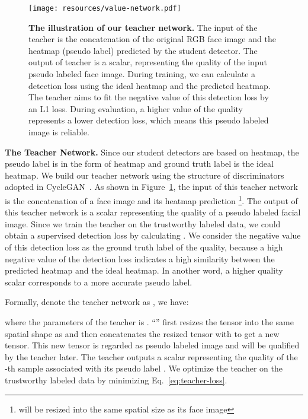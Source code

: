 \documentclass[10pt,twocolumn,letterpaper]{article}
\def\Figref#1{Figure~\ref{#1}}
\def\Eqref#1{{Eq.~\eqref{#1}}}
\begin{document}
\begin{figure}[t]
\center
\texttt{[image: resources/value-network.pdf]}
\caption{
\textbf{The illustration of our teacher network.}
The input of the teacher is the concatenation of the original RGB face image and the heatmap (pseudo label) predicted by the student detector.
The output of teacher is a scalar, representing the quality of the input pseudo labeled face image.
During training, we can calculate a detection loss using the ideal heatmap and the predicted heatmap.
The teacher aims to fit the negative value of this detection loss by an L1 loss.
During evaluation, a higher value of the quality represents a lower detection loss, which means this pseudo labeled image is reliable.
}
\label{fig:value-network}
\end{figure}



\textbf{The Teacher Network.}
Since our student detectors are based on heatmap, the pseudo label is in the form of heatmap and ground truth label is the ideal heatmap.
We build our teacher network using the structure of discriminators adopted in CycleGAN~\cite{zhu2017unpaired}.
As shown in \Figref{fig:value-network}, the input of this teacher network is the concatenation of a face image and its heatmap prediction \footnote{ will be resized into the same spatial size as its face image}.
The output of this teacher network is a scalar representing the quality of a pseudo labeled facial image.
Since we train the teacher on the trustworthy labeled data, we could obtain a supervised detection loss by calculating .
We consider the negative value of this detection loss as the ground truth label of the quality, because a high negative value of the detection loss indicates a high similarity between the predicted heatmap and the ideal heatmap. In another word, a higher quality scalar corresponds to a more accurate pseudo label.

Formally, denote the teacher network as , we have:
{

}\noindent where the parameters of the teacher is .
``'' first resizes the tensor  into the same spatial shape as  and then concatenates the resized tensor with  to get a new tensor. This new tensor is regarded as pseudo labeled image and will be qualified by the teacher later.
The teacher outputs a scalar  representing the quality of the -th sample associated with its pseudo label .
We optimize the teacher on the trustworthy labeled data by minimizing \Eqref{eq:teacher-loss}.
\end{document}
